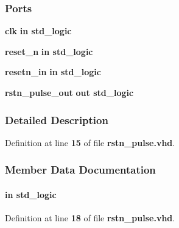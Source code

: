 \subsubsection*{Ports}
 \begin{DoxyCompactItemize}
\item 
{\bf clk}  {\bfseries {\bfseries \textcolor{keywordflow}{in}\textcolor{vhdlchar}{ }}} {\bfseries \textcolor{comment}{std\+\_\+logic}\textcolor{vhdlchar}{ }} 
\item 
{\bf reset\+\_\+n}  {\bfseries {\bfseries \textcolor{keywordflow}{in}\textcolor{vhdlchar}{ }}} {\bfseries \textcolor{comment}{std\+\_\+logic}\textcolor{vhdlchar}{ }} 
\item 
{\bf resetn\+\_\+in}  {\bfseries {\bfseries \textcolor{keywordflow}{in}\textcolor{vhdlchar}{ }}} {\bfseries \textcolor{comment}{std\+\_\+logic}\textcolor{vhdlchar}{ }} 
\item 
{\bf rstn\+\_\+pulse\+\_\+out}  {\bfseries {\bfseries \textcolor{keywordflow}{out}\textcolor{vhdlchar}{ }}} {\bfseries \textcolor{comment}{std\+\_\+logic}\textcolor{vhdlchar}{ }} 
\end{DoxyCompactItemize}


\subsubsection{Detailed Description}


Definition at line {\bf 15} of file {\bf rstn\+\_\+pulse.\+vhd}.



\subsubsection{Member Data Documentation}
\paragraph[{clk}]{ {\bfseries \textcolor{keywordflow}{in}\textcolor{vhdlchar}{ }} {\bfseries \textcolor{comment}{std\+\_\+logic}\textcolor{vhdlchar}{ }} \hspace{0.3cm}{\ttfamily [Port]}}\label{classrstn__pulse_a4a4609c199d30b3adebbeb3a01276ec5}


Definition at line {\bf 18} of file {\bf rstn\+\_\+pulse.\+vhd}.


